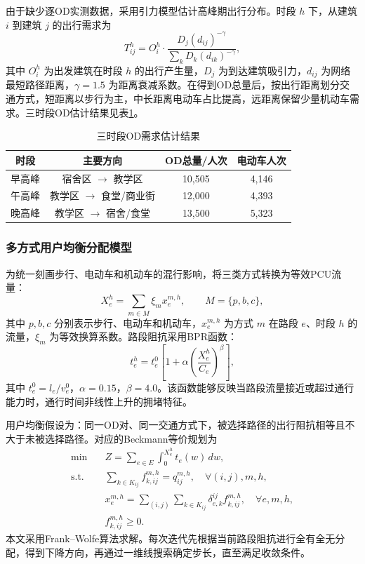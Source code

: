 \documentclass[UTF8,zihao=-4,a4paper]{ctexart}
\begin{document}
由于缺少逐OD实测数据，采用引力模型估计高峰期出行分布。时段 $h$ 下，从建筑 $i$ 到建筑 $j$ 的出行需求为
\begin{equation}
T_{ij}^{h}=O_i^h\cdot \frac{D_j(d_{ij})^{-\gamma}}{\sum_kD_k(d_{ik})^{-\gamma}},
\end{equation}
其中 $O_i^h$ 为出发建筑在时段 $h$ 的出行产生量，$D_j$ 为到达建筑吸引力，$d_{ij}$ 为网络最短路径距离，$\gamma=1.5$ 为距离衰减系数。在得到OD总量后，按出行距离划分交通方式，短距离以步行为主，中长距离电动车占比提高，远距离保留少量机动车需求。三时段OD估计结果见表\ref{tab:od_summary}。

\begin{table}[H]
\centering
\caption{三时段OD需求估计结果}
\label{tab:od_summary}
\begin{tabular}{cccc}
\toprule
\textbf{时段} & \textbf{主要方向} & \textbf{OD总量/人次} & \textbf{电动车人次} \\
\midrule
早高峰 & 宿舍区 $\rightarrow$ 教学区 & 10,505 & 4,146 \\
午高峰 & 教学区 $\rightarrow$ 食堂/商业街 & 12,000 & 4,393 \\
晚高峰 & 教学区 $\rightarrow$ 宿舍/食堂 & 13,500 & 5,323 \\
\bottomrule
\end{tabular}
\end{table}

\subsubsection{多方式用户均衡分配模型}

为统一刻画步行、电动车和机动车的混行影响，将三类方式转换为等效PCU流量：
\begin{equation}
X_e^h=\sum_{m\in M}\xi_m x_e^{m,h},\qquad M=\{p,b,c\},
\end{equation}
其中 $p,b,c$ 分别表示步行、电动车和机动车，$x_e^{m,h}$ 为方式 $m$ 在路段 $e$、时段 $h$ 的流量，$\xi_m$ 为等效换算系数。路段阻抗采用BPR函数：
\begin{equation}
t_e^h=t_e^0\left[1+\alpha\left(\frac{X_e^h}{C_e}\right)^\beta\right],
\end{equation}
其中 $t_e^0=l_e/v_e^0$，$\alpha=0.15$，$\beta=4.0$。该函数能够反映当路段流量接近或超过通行能力时，通行时间非线性上升的拥堵特征。

用户均衡假设为：同一OD对、同一交通方式下，被选择路径的出行阻抗相等且不大于未被选择路径。对应的Beckmann等价规划为
\begin{equation}
\begin{aligned}
\min \quad & Z=\sum_{e\in E}\int_0^{X_e^h}t_e(w)\,dw,\\
\text{s.t.}\quad & \sum_{k\in K_{ij}} f_{k,ij}^{m,h}=q_{ij}^{m,h},\quad \forall(i,j),m,h,\\
& x_e^{m,h}=\sum_{(i,j)}\sum_{k\in K_{ij}}\delta_{e,k}^{ij}f_{k,ij}^{m,h},\quad \forall e,m,h,\\
& f_{k,ij}^{m,h}\ge 0.
\end{aligned}
\end{equation}
本文采用Frank--Wolfe算法求解。每次迭代先根据当前路段阻抗进行全有全无分配，得到下降方向，再通过一维线搜索确定步长，直至满足收敛条件。
\end{document}
